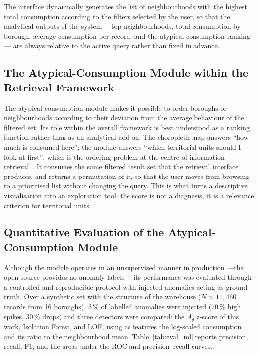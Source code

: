 \documentclass[runningheads]{llncs}
\renewcommand{\_}{\origunderscore\allowbreak}
\newif\ifshowchanges
\newcommand{\new}[1]{\ifshowchanges\textcolor{chg}{#1}\else#1\fi}
\begin{document}
The interface dynamically generates the list of neighbourhoods with the highest
total consumption according to the filters selected by the user, so that the
analytical outputs of the system ---top neighbourhoods, total consumption by
borough, average consumption per record, and the atypical-consumption ranking---
are always relative to the active query rather than fixed in advance.

\subsection{The Atypical-Consumption Module within the Retrieval Framework}

The atypical-consumption module makes it possible to order boroughs or
neighbourhoods according to their deviation from the average behaviour of the
filtered set. \new{Its role within the overall framework is best understood as a
ranking function rather than as an analytical add-on. The choropleth map answers
``how much is consumed here''; the module answers ``which territorial units
should I look at first'', which is the ordering problem at the centre of
information retrieval~\cite{purves2018}. It consumes the same filtered result set
that the retrieval interface produces, and returns a permutation of it, so that
the user moves from browsing to a prioritised list without changing the query.
This is what turns a descriptive visualisation into an exploration tool: the
score is not a diagnosis, it is a relevance criterion for territorial units.}

\subsection{Quantitative Evaluation of the Atypical-Consumption Module}
\label{sec:mleval}

Although the module operates in an unsupervised manner in production ---the open
source provides no anomaly labels--- its performance was evaluated through a
controlled and reproducible protocol with injected anomalies acting as ground
truth. Over a synthetic set with the structure of the warehouse
($N\approx11{,}460$ records from 16 boroughs), 3\,\% of labelled anomalies were
injected (70\,\% high spikes, 30\,\% drops) and three detectors were compared:
the $A_g$ z-score of this work, Isolation Forest, and LOF, using as features the
log-scaled consumption and its ratio to the neighbourhood mean.
Table~\ref{tab:eval_ml} reports precision, recall, F1, and the areas under the
ROC and precision--recall curves.
\end{document}
